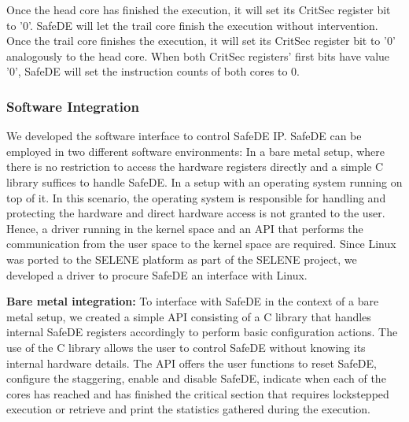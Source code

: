 Once the head core has finished the execution, it will set its CritSec register bit to '0'. SafeDE will let the trail core finish the execution without intervention. Once the trail core finishes the execution, it will set its CritSec register bit to '0' analogously to the head core. When both CritSec registers' first bits have value '0', SafeDE will set the instruction counts of both cores to 0.
\bigskip


\subsubsection{Software Integration}
\label{section:software_integration}

We developed the software interface to control SafeDE IP. SafeDE can be employed in two different software environments: In a bare metal setup, where there is no restriction to access the hardware registers directly and a simple C library suffices to handle SafeDE. In a setup with an operating system running on top of it. In this scenario, the operating system is responsible for handling and protecting the hardware and direct hardware access is not granted to the user. Hence, a driver running in the kernel space and an API that performs the communication from the user space to the kernel space are required. Since Linux was ported to the SELENE platform as part of the SELENE project, we developed a driver to procure SafeDE an interface with Linux.

\textbf{Bare metal integration:} To interface with SafeDE in the context of a bare metal setup, we created a simple API consisting of a C library that handles internal SafeDE registers accordingly to perform basic configuration actions. The use of the C library allows the user to control SafeDE without knowing its internal hardware details. The API offers the user functions to reset SafeDE, configure the staggering, enable and disable SafeDE, indicate when each of the cores has reached and has finished the critical section that requires lockstepped execution or retrieve and print the statistics gathered during the execution. 

